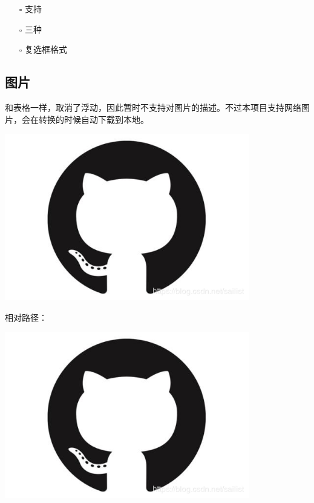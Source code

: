 \documentclass[UTF8]{ctexart}
\newenvironment{marktext}{}{}
\begin{document}
\begin{itemize}
\item[\rlap{\raisebox{0.3ex}{\hspace{0.4ex}\tiny \ding{52}}}$\square$]
支持
\item[\rlap{\raisebox{0.3ex}{\hspace{0.4ex}\scriptsize \ding{56}}}$\square$]
三种
\item[$\square$]
复选框格式
\end{itemize}
\begin{marktext}


\subsection{图片}


和表格一样，取消了浮动，因此暂时不支持对图片的描述。不过本项目支持网络图片，会在转换的时候自动下载到本地。


\begin{center}
\begin{marktext}
\vspace{\baselineskip}\includegraphics[width=0.8\textwidth]{images/1c59f8ef2aa3c5e527a22b7c258489d6.jpg}\vspace{\baselineskip}
\end{marktext}
\end{center}


相对路径：
\begin{center}
\begin{marktext}
\vspace{\baselineskip}\includegraphics[width=0.8\textwidth]{images/17d353012390f9f83be4ee990a4dfbdc.png}\vspace{\baselineskip}
\end{marktext}
\end{center}



\end{marktext}
\end{document}
